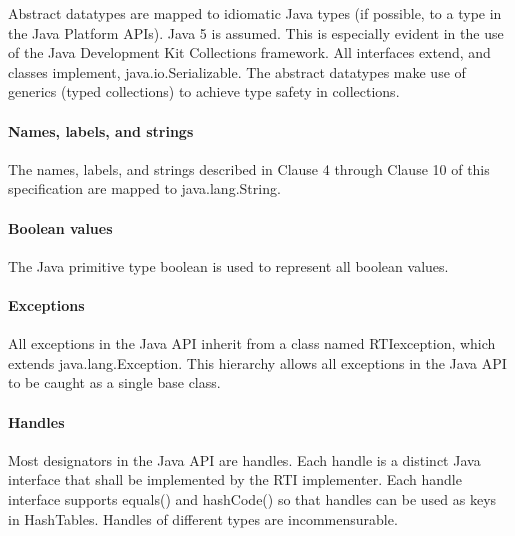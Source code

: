 \begin{compactstdpage}
    Abstract datatypes are mapped to idiomatic Java types (if possible, to a type in the Java Platform APIs). Java 5 is assumed. This is especially evident in the use of the Java Development Kit Collections framework. All interfaces extend, and classes implement, java.io.Serializable. The abstract datatypes make use of generics (typed collections) to achieve type safety in collections.

    \paragraph{Names, labels, and strings}

    The names, labels, and strings described in Clause 4 through Clause 10 of this specification are mapped to java.lang.String.

    \paragraph{Boolean values}

    The Java primitive type boolean is used to represent all boolean values.

    \paragraph{Exceptions}

    All exceptions in the Java API inherit from a class named RTIexception, which extends java.lang.Exception. This hierarchy allows all exceptions in the Java API to be caught as a single base class.

    \paragraph{Handles}

    Most designators in the Java API are handles. Each handle is a distinct Java interface that shall be implemented by the RTI implementer. Each handle interface supports equals() and hashCode() so that handles can be used as keys in HashTables. Handles of different types are incommensurable.

\end{compactstdpage}

\clearpage

